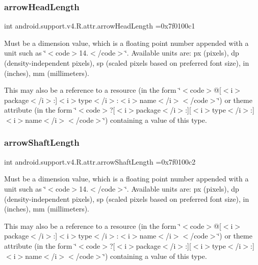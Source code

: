 \subsubsection{\texorpdfstring{arrow\+Head\+Length}{arrowHeadLength}}
{\footnotesize\ttfamily int android.\+support.\+v4.\+R.\+attr.\+arrow\+Head\+Length =0x7f0100c1\hspace{0.3cm}{\ttfamily [static]}}

Must be a dimension value, which is a floating point number appended with a unit such as \char`\"{}$<$code$>$14.\+5sp$<$/code$>$\char`\"{}. Available units are\+: px (pixels), dp (density-\/independent pixels), sp (scaled pixels based on preferred font size), in (inches), mm (millimeters). 

This may also be a reference to a resource (in the form \char`\"{}$<$code$>$@\mbox{[}$<$i$>$package$<$/i$>$\+:\mbox{]}$<$i$>$type$<$/i$>$\+:$<$i$>$name$<$/i$>$$<$/code$>$\char`\"{}) or theme attribute (in the form \char`\"{}$<$code$>$?\mbox{[}$<$i$>$package$<$/i$>$\+:\mbox{]}\mbox{[}$<$i$>$type$<$/i$>$\+:\mbox{]}$<$i$>$name$<$/i$>$$<$/code$>$\char`\"{}) containing a value of this type. \mbox{\label{classandroid_1_1support_1_1v4_1_1R_1_1attr_a5b8710bfc0b35653f4f7cc097e377dfc}} 
\subsubsection{\texorpdfstring{arrow\+Shaft\+Length}{arrowShaftLength}}
{\footnotesize\ttfamily int android.\+support.\+v4.\+R.\+attr.\+arrow\+Shaft\+Length =0x7f0100c2\hspace{0.3cm}{\ttfamily [static]}}

Must be a dimension value, which is a floating point number appended with a unit such as \char`\"{}$<$code$>$14.\+5sp$<$/code$>$\char`\"{}. Available units are\+: px (pixels), dp (density-\/independent pixels), sp (scaled pixels based on preferred font size), in (inches), mm (millimeters). 

This may also be a reference to a resource (in the form \char`\"{}$<$code$>$@\mbox{[}$<$i$>$package$<$/i$>$\+:\mbox{]}$<$i$>$type$<$/i$>$\+:$<$i$>$name$<$/i$>$$<$/code$>$\char`\"{}) or theme attribute (in the form \char`\"{}$<$code$>$?\mbox{[}$<$i$>$package$<$/i$>$\+:\mbox{]}\mbox{[}$<$i$>$type$<$/i$>$\+:\mbox{]}$<$i$>$name$<$/i$>$$<$/code$>$\char`\"{}) containing a value of this type. \mbox{\label{classandroid_1_1support_1_1v4_1_1R_1_1attr_a1431731a557fac44d41907daa49e4b8f}} 
